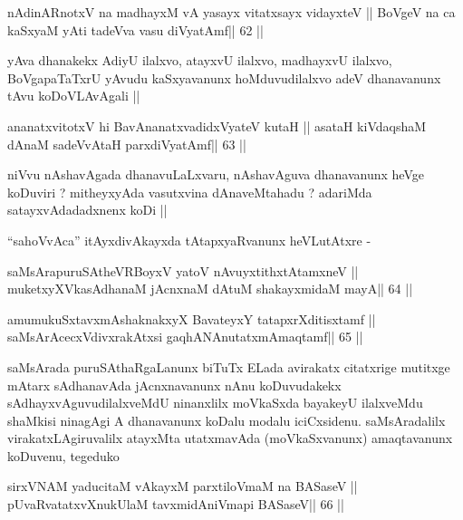 \begin{shl}
nA\s\s dinARnotxV na madhayxM vA yasayx vitatxsayx vidayxteV ||
BoVgeV na ca kaSxyaM yAti tadeVva vasu diVyatAmf\hfill || 62 ||
\end{shl}

\begin{artha}
yAva dhanakekx AdiyU ilalxvo, atayxvU ilalxvo, madhayxvU ilalxvo,
BoVgapaTaTxrU yAvudu kaSxyavanunx hoMduvudilalxvo adeV dhanavanunx
tAvu koDoVLAvAgali ||
\end{artha}

\begin{shl}
ananatxvitotxV hi BavAnanatxvadidxVyateV kutaH ||
asataH kiVdaqshaM dAnaM sadeVvAtaH parxdiVyatAmf\hfill || 63 ||
\end{shl}

\begin{artha}
niVvu nAshavAgada dhanavuLaLxvaru, nAshavAguva dhanavanunx heVge
koDuviri ? mitheyxyAda vasutxvina dAnaveMtahadu ? adariMda
satayxvAdadadxnenx koDi ||
\end{artha}

\begin{artha}
``sahoVvAca'' itAyxdivAkayxda tAtapxyaRvanunx heVLutAtxre -
\end{artha}

\begin{shl}
saMsArapuruSAtheVRBoyxV yatoV nAvuyxtithxtAtamxneV ||
muketxyXVkasAdhanaM jAcnxnaM dAtuM shakayxmidaM mayA\hfill || 64 ||
\end{shl}

\begin{shl}
amumukuSxtavxmAshaknakxyX BavateyxY tatapxrXditisxtamf ||
saMsArAcecxVdivxrakAtx\s si gaqhANAnutatxmAmaqtamf\hfill || 65 ||
\end{shl}

\begin{artha}
saMsArada puruSAthaRgaLanunx biTuTx ELada avirakatx citatxrige
mutitxge mAtarx sAdhanavAda jAcnxnavanunx nAnu koDuvudakekx
sAdhayxvAguvudilalxveMdU ninanxlilx moVkaSxda bayakeyU ilalxveMdu
shaMkisi ninagAgi A dhanavanunx koDalu modalu
iciCxsidenu. saMsAradalilx virakatxLAgiruvalilx atayxMta utatxmavAda
(moVkaSxvanunx) amaqtavanunx koDuvenu, tegeduko
\end{artha}

\begin{shl}
sirxVNAM yaducitaM vAkayxM parxtiloVmaM na BASaseV ||
pUvaRvatatxvXnukUlaM tavxmidAniVmapi BASaseV\hfill || 66 ||
\end{shl}

